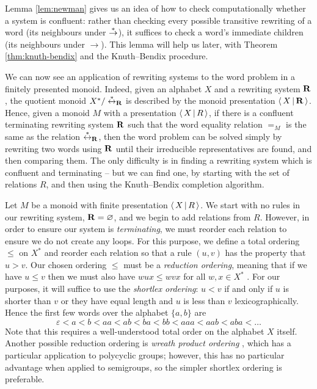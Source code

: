 Lemma \ref{lem:newman} gives us an idea of how to check computationally whether
a system is confluent: rather than checking every possible transitive rewriting
of a word (its neighbours under $\stackrel{*}{\to}$), it suffices to check a word's
immediate children (its neighbours under $\to$).  This lemma will help us later,
with Theorem \ref{thm:knuth-bendix} and the Knuth--Bendix procedure.

We can now see an application of rewriting systems to the word problem in a
finitely presented monoid.  Indeed, given an alphabet $X$ and a rewriting system
$\mathbf{R}$, the quotient monoid $X^* / \stackrel{*}{\leftrightarrow}_{\mathbf{R}}$ is described by the
monoid presentation $\left\langle\,X\,\middle|\,\mathbf{R}\,\right\rangle$.  Hence, given a monoid $M$ with a
presentation $\left\langle\,X\,\middle|\,R\,\right\rangle$, if there is a confluent terminating rewriting system
$\mathbf{R}$ such that the word equality relation $=_M$ is the same as the
relation $\stackrel{*}{\leftrightarrow}_{\mathbf{R}}$, then the word problem can be solved
simply by rewriting two words using $\mathbf{R}$ until their irreducible
representatives are found, and then comparing them.  The only difficulty is in
finding a rewriting system which is confluent and terminating -- but we can find
one, by starting with the set of relations $R$, and then using the Knuth--Bendix
completion algorithm.

Let $M$ be a monoid with finite presentation $\left\langle\,X\,\middle|\,R\,\right\rangle$.  We start with no
rules in our rewriting system, $\mathbf{R} = \varnothing$, and we begin to add
relations from $R$.  However, in order to ensure our system is
\textit{terminating}, we must reorder each relation to ensure we do not create
any loops.  For this purpose, we define a total ordering $\leq$ on $X^*$ and
reorder each relation so that a rule $(u, v)$ has the property that $u > v$.
Our chosen ordering $\leq$ must be a 
\textit{reduction ordering}, meaning that if we have $u \leq v$ then we must
also have $wux \leq wvx$ for all $w,x \in X^*$ \cite[\S12.2]{cgt}.  For our
purposes, it will suffice to use the  \textit{shortlex
  ordering}: $u < v$ if and only if $u$ is shorter than $v$ or they have equal
length and $u$ is less than $v$ lexicographically.  Hence the first few words
over the alphabet $\{a, b\}$ are
$$\varepsilon < a < b < aa < ab < ba < bb < aaa < aab < aba < \ldots$$
Note that this requires a well-understood total order on the alphabet $X$
itself.  Another possible reduction ordering is \textit{wreath product ordering}
\cite[\S2.1]{sims}, which has a particular application to polycyclic groups;
however, this has no particular advantage when applied to semigroups, so the
simpler shortlex ordering is preferable.

